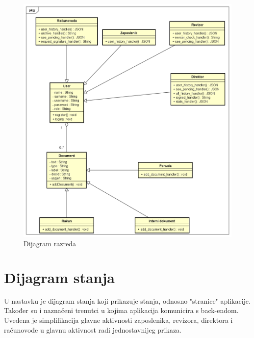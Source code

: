 			\begin{figure}
				\includegraphics[width=\linewidth]{./dijagrami/dijagram_razreda.png}
				\caption{Dijagram razreda}
				\label{fig:Class}
			\end{figure}
			
			
			
			\eject
		
		\section{Dijagram stanja}
			
			
		
			
			U nastavku je dijagram stanja koji prikazuje stanja, odnosno "stranice" aplikacije. 
			Također su i naznačeni trenutci  u kojima aplikacija komunicira s back-endom. Uvedena je simplifikacija glavne aktivnosti zaposlenika, revizora, direktora i računovođe u glavnu aktivnost radi jednostavnijeg prikaza.
			
			\bigskip
			\bigskip
			\bigskip
			
